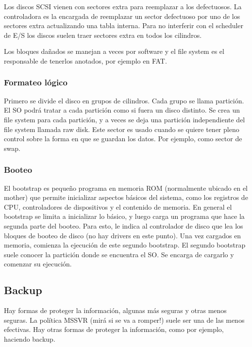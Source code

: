 \documentclass{article}
\begin{document}
Los discos SCSI vienen con sectores extra para reemplazar a los defectuosos. La controladora es la encargada de reemplazar un sector defectuoso por uno de los sectores extra actualizando una tabla interna. Para no interferir con el scheduler de E/S los discos suelen traer sectores extra en todos los cilindros.

Los bloques da\~nados se manejan a veces por software y el file system es el responsable de tenerlos anotados, por ejemplo en FAT.

\subsubsection{Formateo l\'ogico}

Primero se divide el disco en grupos de cilindros. Cada grupo se
llama partición. El SO podrá tratar a cada partición como si fuera
un disco distinto. Se crea un file system para cada partición, y a veces se
deja una partición independiente del file system llamada raw disk. Este sector es usado cuando se quiere tener pleno control sobre la
forma en que se guardan los datos. Por ejemplo, como sector de swap.

\subsubsection{Booteo}
El bootstrap es pequeño programa en memoria ROM (normalmente ubicado en el mother) que permite inicializar aspectos básicos del sistema, como los registros de CPU, controladores de dispositivos y el contenido de memoria. En general el bootstrap se limita a inicializar lo básico, y luego
carga un programa que hace la segunda parte del booteo. Para esto, le indica al controlador de disco que lea los bloques de booteo de disco (no hay drivers en este punto). 
Una vez cargados en memoria, comienza la ejecución de este segundo bootstrap. El segundo bootstrap suele conocer la partición donde se encuentra el SO. Se encarga de cargarlo y comenzar su ejecución.

\subsection{Backup}

Hay formas de proteger la informaci\'on, algunas m\'as seguras y otras menos seguras. La pol\'itica MSSVR (mir\'a si se va a romper!) suele ser una de las menos efectivas. Hay otras formas de proteger la informaci\'on, como por ejemplo, haciendo backup.
\end{document}
